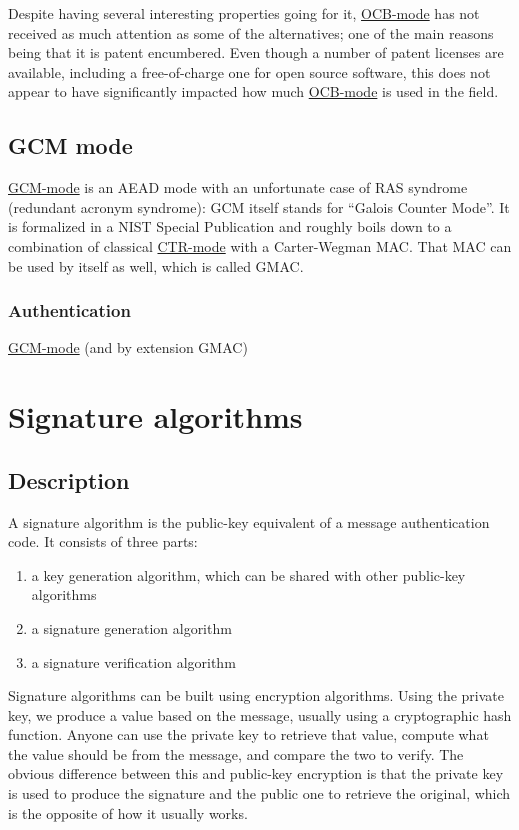 \documentclass[11pt,ebook,table,dvipsnames]{memoir}
\begin{document}
Despite having several interesting properties going for it, \hyperref[OCB mode]{OCB-mode}
has not received as much attention as some of the alternatives; one of
the main reasons being that it is patent encumbered. Even though a
number of patent licenses are available\cite{ocb:license}, including a
free-of-charge one for open source software, this does not appear to
have significantly impacted how much \hyperref[OCB mode]{OCB-mode} is used in the field.
\section{\label{GCM-mode}GCM mode}
\label{sec-2-7-9}

\hyperref[GCM mode]{GCM-mode} is an \gls{AEAD mode} with an unfortunate case of RAS
syndrome (redundant acronym syndrome): GCM itself stands for \enquote{Galois
Counter Mode}. It is formalized in a NIST Special
Publication\cite{gcm} and roughly boils down to a combination of
classical \hyperref[CTR mode]{CTR-mode} with a \gls{Carter-Wegman MAC}. That MAC can be
used by itself as well, which is called \gls{GMAC}.

\subsection{Authentication}
\label{sec-2-7-9-1}

\hyperref[GCM mode]{GCM-mode} (and by extension GMAC)
\chapter{Signature algorithms}
\label{sec-2-8}
\section{Description}
\label{sec-2-8-1}

A signature algorithm is the public-key equivalent of a message
authentication code. It consists of three parts:

\begin{enumerate}
\item a key generation algorithm, which can be shared with other
public-key algorithms
\item a signature generation algorithm
\item a signature verification algorithm
\end{enumerate}

Signature algorithms can be built using encryption algorithms. Using
the private key, we produce a value based on the message, usually
using a cryptographic hash function. Anyone can use the private key to
retrieve that value, compute what the value should be from the
message, and compare the two to verify. The obvious difference between
this and \gls{public-key encryption} is that the private key is used
to produce the signature and the public one to retrieve the original,
which is the opposite of how it usually works.
\end{document}
